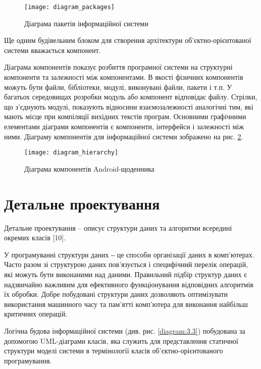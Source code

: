 \documentclass[../main.tex]{subfiles}
\begin{document}

\begin{figure}[H]
	\centering
	\texttt{[image: diagram\_packages]}
	\caption{Діаграма пакетів інформаційної системи}
	\label{diagram:3.1}
\end{figure}

Ще одним будівельним блоком для створення архітектури об'єктно-орієнтованої системи вважається компонент. \cite{diploma_guidelines}

Діаграма компонентів показує розбиття програмної системи на структурні компоненти та залежності між компонентами. В якості фізичних компонентів можуть бути файли, бібліотеки, модулі, виконувані файли, пакети і т.п. У багатьох середовищах розробки модуль або компонент відповідає файлу. Стрілки, що з'єднують модулі, показують відносини взаємозалежності аналогічні тим, які мають місце при компіляції вихідних текстів програм. Основними графічними елементами діаграми компонентів є компоненти, інтерфейси і залежності між ними. Діаграму компонентів для інформаційної системи зображено на рис. \ref{diagram:3.2}.


\begin{figure}[H]
	\centering
	\texttt{[image: diagram\_hierarchy]}
	\caption{Діаграма компонентів Android-щоденника}
	\label{diagram:3.2}
\end{figure}

\section{Детальне проектування}

Детальне проектування – описує структури даних та алгоритми всередині окремих класів [10]. 

У програмуванні структури даних ‒ це способи організації даних в комп’ютерах. Часто разом зі структурою даних пов’язується і специфічний перелік операцій, які можуть бути виконаними над даними.
Правильний підбір структур даних є надзвичайно важливим для ефективного функціонування відповідних алгоритмів їх обробки. Добре побудовані структури даних дозволяють оптимізувати використання машинного часу та пам’ятті комп’ютера для виконання найбільш критичних операцій.

Логічна будова інформаційної системи (див. рис. \ref{diagram:3.3}) побудована  за допомогою UML-діаграми класів, яка служить для представлення статичної структури моделі системи в термінології класів об’єктно-орієнтованого програмування.
\end{document}
